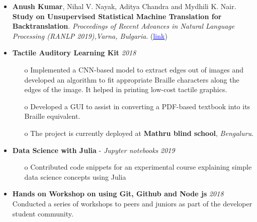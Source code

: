\documentclass[11pt,a4paper]{article}
\begin{document}
\colorbox{gray}{}
\begin{itemize}
    \item \textbf{Anush Kumar}, Nihal V. Nayak, Aditya Chandra and Mydhili K. Nair. \textbf{Study on Unsupervised Statistical Machine Translation for Backtranslation}. \textit{Proceedings of Recent Advances in Natural Language Processing (RANLP 2019),Varna, Bulgaria}. (\href{https://aclanthology.org/R19-1068/}{\textcolor{blue}{link}}) 
\end{itemize}

\colorbox{gray}{}
\begin{itemize}
    \item \textbf{Tactile Auditory Learning Kit} \hfill \textit{2018}
    \begin{itemize}
        \item[o] Implemented a CNN-based model to extract edges out of images and developed an algorithm to fit appropriate Braille characters along the edges of the image. It helped in printing low-cost tactile graphics.
        \item[o] Developed a GUI to assist in converting a PDF-based textbook into its Braille equivalent. 
        \item[o] The project is currently deployed at \textbf{Mathru blind school}, \emph{Bengaluru}.
    \end{itemize}
    \item \textbf{Data Science with Julia} - \textit{Jupyter notebooks} \hfill \textit{2019}
    \begin{itemize}
        \item[o] Contributed code snippets for an experimental course explaining simple data science concepts using Julia
    \end{itemize}
\end{itemize}

\colorbox{gray}{}
\begin{itemize}
    \item \textbf{Hands on Workshop on using  Git, Github and Node js} \hfill \textit{2018}
    \\Conducted a series of workshops to peers and juniors as part of the developer student community.
\end{itemize}
\end{document}
